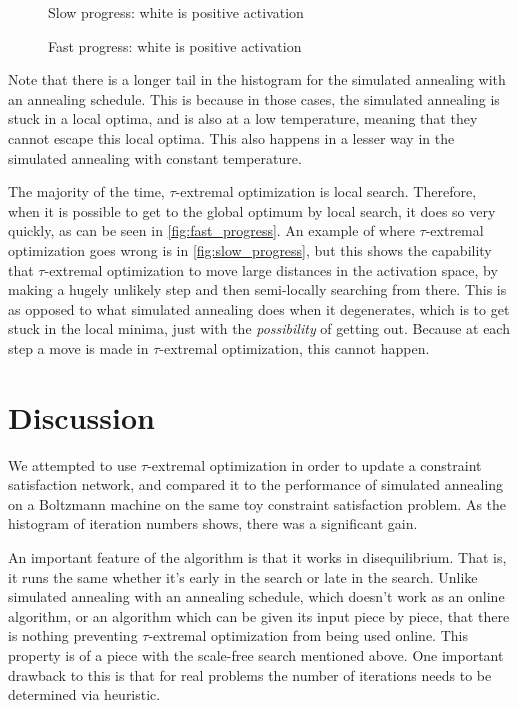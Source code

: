 \documentclass[12pt]{article}
\begin{document}
\begin{figure}
  \label{fig:slow_progess}
  \caption{Slow progress: white is positive activation}
\end{figure}
\begin{figure}
  \label{fig:fast_progess}
  \caption{Fast progress: white is positive activation}
\end{figure}

Note that there is a longer tail in the histogram for the simulated annealing with an annealing schedule. This is because in those cases, the simulated annealing is stuck in a local optima, and is also at a low temperature, meaning that they cannot escape this local optima. This also happens in a lesser way in the simulated annealing with constant temperature.

The majority of the time, $\tau$-extremal optimization is local search. Therefore, when it is possible to get to the global optimum by local search, it does so very quickly, as can be seen in \ref{fig:fast_progress}. An example of where $\tau$-extremal optimization goes wrong is in \ref{fig:slow_progress}, but this shows the capability that $\tau$-extremal optimization to move large distances in the activation space, by making a hugely unlikely step and then semi-locally searching from there. This is as opposed to what simulated annealing does when it degenerates, which is to get stuck in the local minima, just with the \emph{possibility} of getting out. Because at each step a move is made in $\tau$-extremal optimization, this cannot happen.

\section{Discussion}
We attempted to use $\tau$-extremal optimization in order to update a constraint satisfaction network, and compared it to the performance of simulated annealing on a Boltzmann machine on the same toy constraint satisfaction problem. As the histogram of iteration numbers shows, there was a significant gain.

An important feature of the algorithm is that it works in disequilibrium. That is, it runs the same whether it's early in the search or late in the search. Unlike simulated annealing with an annealing schedule, which doesn't work as an online algorithm, or an algorithm which can be given its input piece by piece, that there is nothing preventing $\tau$-extremal optimization from being used online. This property is of a piece with the scale-free search mentioned above. One important drawback to this is that for real problems the number of iterations needs to be determined via heuristic.
\end{document}
